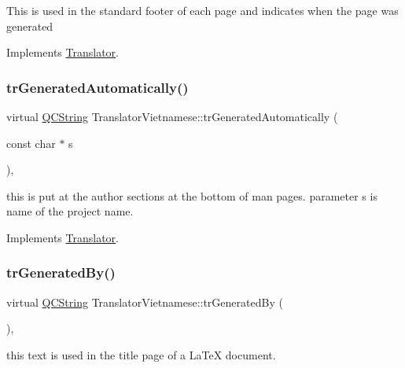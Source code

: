 This is used in the standard footer of each page and indicates when the page was generated 

Implements \mbox{\hyperlink{class_translator}{Translator}}.

\mbox{\label{class_translator_vietnamese_af9dd0be1f90f275d0347e0908c746fd5}} 
\subsubsection{\texorpdfstring{trGeneratedAutomatically()}{trGeneratedAutomatically()}}
{\footnotesize\ttfamily virtual \mbox{\hyperlink{class_q_c_string}{Q\+C\+String}} Translator\+Vietnamese\+::tr\+Generated\+Automatically (\begin{DoxyParamCaption}\item[{const char $\ast$}]{s }\end{DoxyParamCaption})\hspace{0.3cm}{\ttfamily [inline]}, {\ttfamily [virtual]}}

this is put at the author sections at the bottom of man pages. parameter s is name of the project name. 

Implements \mbox{\hyperlink{class_translator}{Translator}}.

\mbox{\label{class_translator_vietnamese_a3807e0385865b46dd324e3107b01bdec}} 
\subsubsection{\texorpdfstring{trGeneratedBy()}{trGeneratedBy()}}
{\footnotesize\ttfamily virtual \mbox{\hyperlink{class_q_c_string}{Q\+C\+String}} Translator\+Vietnamese\+::tr\+Generated\+By (\begin{DoxyParamCaption}{ }\end{DoxyParamCaption})\hspace{0.3cm}{\ttfamily [inline]}, {\ttfamily [virtual]}}

this text is used in the title page of a La\+TeX document. 

